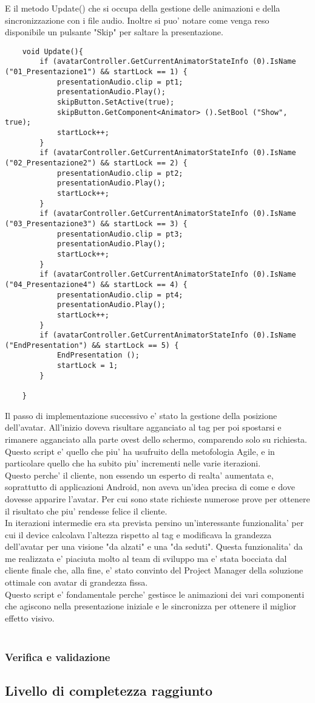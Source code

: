 E il metodo Update() che si occupa della gestione delle animazioni e della sincronizzazione con i file audio. Inoltre si puo' notare come venga reso disponibile un pulsante "Skip" per saltare la presentazione.
\begin{lstlisting}
	void Update(){
		if (avatarController.GetCurrentAnimatorStateInfo (0).IsName ("01_Presentazione1") && startLock == 1) {
			presentationAudio.clip = pt1;
			presentationAudio.Play();
			skipButton.SetActive(true);
			skipButton.GetComponent<Animator> ().SetBool ("Show", true);
			startLock++;
		}
		if (avatarController.GetCurrentAnimatorStateInfo (0).IsName ("02_Presentazione2") && startLock == 2) {
			presentationAudio.clip = pt2;
			presentationAudio.Play();
			startLock++;
		}
		if (avatarController.GetCurrentAnimatorStateInfo (0).IsName ("03_Presentazione3") && startLock == 3) {
			presentationAudio.clip = pt3;
			presentationAudio.Play();
			startLock++;
		}
		if (avatarController.GetCurrentAnimatorStateInfo (0).IsName ("04_Presentazione4") && startLock == 4) {
			presentationAudio.clip = pt4;
			presentationAudio.Play();
			startLock++;
		}
		if (avatarController.GetCurrentAnimatorStateInfo (0).IsName ("EndPresentation") && startLock == 5) {
			EndPresentation ();
			startLock = 1;
		}
	
	}
\end{lstlisting}

Il passo di implementazione successivo e' stato la gestione della posizione dell'avatar. All'inizio doveva risultare agganciato al tag per poi spostarsi e rimanere agganciato alla parte ovest dello schermo, comparendo solo su richiesta.\\
Questo script e' quello che piu' ha usufruito della metofologia Agile, e in particolare quello che ha subito piu' incrementi nelle varie iterazioni.\\
Questo perche' il cliente, non essendo un esperto di realta' aumentata e, soprattutto di applicazioni Android, non aveva un'idea precisa di come e dove dovesse apparire l'avatar. Per cui sono state richieste numerose prove per ottenere il risultato che piu' rendesse felice il cliente.\\
In iterazioni intermedie era sta prevista persino un'interessante funzionalita' per cui il device calcolava l'altezza rispetto al tag e modificava la grandezza dell'avatar per una visione "da alzati" e una "da seduti". Questa funzionalita' da me realizzata e' piaciuta molto al team di sviluppo ma e' stata bocciata dal cliente finale che, alla fine, e' stato convinto del Project Manager della soluzione ottimale con avatar di grandezza fissa.\\
Questo script e' fondamentale perche' gestisce le animazioni dei vari componenti che agiscono nella presentazione iniziale e le sincronizza per ottenere il miglior effetto visivo.\\\\





\subsubsection{Verifica e validazione}

\subsection{Livello di completezza raggiunto}